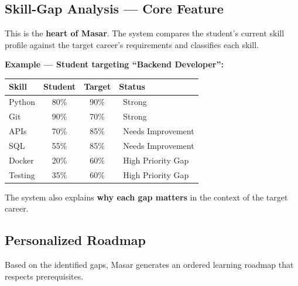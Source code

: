 \documentclass[12pt,a4paper]{article}
\newcommand{\strongmark}{\textcolor{masargreen}{\ding{51}}}
\newcommand{\warnmark}{\textcolor{masarorange}{\ding{115}}}
\newcommand{\gapmark}{\textcolor{masarred}{\ding{55}}}
\begin{document}
\subsection{Skill-Gap Analysis --- Core Feature}
\label{sec:mvp-gap}

This is the \textbf{heart of Masar}. The system compares the student's current skill profile against the target career's requirements and classifies each skill.

\bigskip
\noindent\textbf{Example --- Student targeting ``Backend Developer'':}

\begin{center}
\begin{tabular}{@{} l c c l @{}}
\toprule
\textbf{Skill} & \textbf{Student} & \textbf{Target} & \textbf{Status} \\
\midrule
Python  & 80\% & 90\% & \strongmark\ Strong \\
Git     & 90\% & 70\% & \strongmark\ Strong \\
APIs    & 70\% & 85\% & \warnmark\ Needs Improvement \\
SQL     & 55\% & 85\% & \warnmark\ Needs Improvement \\
Docker  & 20\% & 60\% & \gapmark\ High Priority Gap \\
Testing & 35\% & 60\% & \gapmark\ High Priority Gap \\
\bottomrule
\end{tabular}
\end{center}

\noindent The system also explains \textbf{why each gap matters} in the context of the target career.

\subsection{Personalized Roadmap}
\label{sec:mvp-roadmap}

Based on the identified gaps, Masar generates an ordered learning roadmap that respects prerequisites.

\begin{center}
\end{center}
\end{document}
